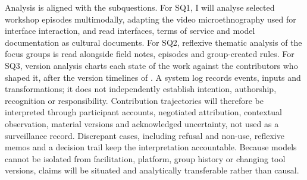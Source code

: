 Analysis is aligned with the subquestions. For SQ1, I will analyse selected
workshop episodes multimodally, adapting the video microethnography
\citet{mcarthur2015} used for interface interaction, and read interfaces,
terms of service and model documentation as cultural documents. For SQ2,
reflexive thematic analysis of the focus groups \citep{braun2019} is read
alongside field notes, episodes and group-created rules. For SQ3, version
analysis charts each state of the work against the contributors who shaped
it, after the version timelines of \citet[10]{hodson2019}. A system log records events, inputs and
transformations; it does not independently establish intention, authorship,
recognition or responsibility. Contribution trajectories will therefore be
interpreted through participant accounts, negotiated attribution, contextual
observation, material versions and acknowledged uncertainty, not used as a
surveillance record. Discrepant cases, including refusal and non-use,
reflexive memos and a decision trail keep the interpretation accountable. Because models cannot be isolated from
facilitation, platform, group history or changing tool versions, claims will
be situated and analytically transferable rather than causal.

